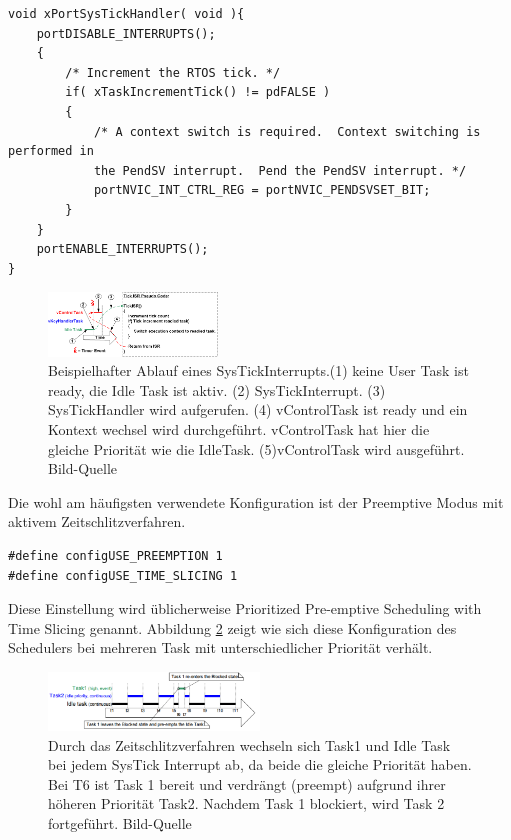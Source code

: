 \begin{lstlisting}[caption={FreeRTOS Source des SysTickHandlers aus Task.c. Der SysTickHandler verwaltet den TickCount. Der TickCount dient allen Timingfunktionen des RTOS Kernels als Zeitreferenz. Des Weiteren wird bei aktivem Time Slicing überprüft ob ein Kontextwechsel nötig ist. Der Kontext wechsel wir dann ggf. durch den PendSVHandler durchgeführt.}, linewidth=8cm,captionpos=b, label=lst:SysTickS, float=hbt]
void xPortSysTickHandler( void ){
	portDISABLE_INTERRUPTS();
	{
		/* Increment the RTOS tick. */
		if( xTaskIncrementTick() != pdFALSE )
		{
			/* A context switch is required.  Context switching is performed in
			the PendSV interrupt.  Pend the PendSV interrupt. */
			portNVIC_INT_CTRL_REG = portNVIC_PENDSVSET_BIT;
		}
	}
	portENABLE_INTERRUPTS();
}
\end{lstlisting}
\begin{figure}[htb]
	\centering
		\includegraphics[width=0.4\textwidth]{Pictures/FreeRTOSOrg/TickISR.png}
	\caption{Beispielhafter Ablauf eines SysTickInterrupts.(1) keine User Task ist ready, die Idle Task ist aktiv. (2) SysTickInterrupt. (3) SysTickHandler wird aufgerufen. (4) vControlTask ist ready und ein Kontext wechsel wird durchgeführt. vControlTask hat hier die gleiche Priorität wie die IdleTask. (5)vControlTask wird ausgeführt. Bild-Quelle~\protect{}}
	\label{fig:SysTick}
\end{figure}
\newline
Die wohl am häufigsten verwendete Konfiguration ist der Preemptive Modus mit aktivem Zeitschlitzverfahren.
\begin{lstlisting}[numbers = none]
#define configUSE_PREEMPTION 1
#define configUSE_TIME_SLICING 1
\end{lstlisting}
Diese Einstellung wird üblicherweise Prioritized Pre-emptive Scheduling with Time Slicing genannt. Abbildung \ref{fig:timeslice} zeigt wie sich diese Konfiguration des Schedulers bei mehreren Task mit unterschiedlicher Priorität verhält.
\begin{figure}[htb]
	\centering
		\includegraphics[width=0.5\textwidth]{Pictures/Scheduling/timeslice2.png}
	\caption{Durch das Zeitschlitzverfahren wechseln sich Task1 und Idle Task bei jedem SysTick Interrupt ab, da beide die gleiche Priorität haben. Bei T6 ist Task 1 bereit und verdrängt (preempt) aufgrund ihrer höheren Priorität Task2. Nachdem Task 1 blockiert, wird Task 2 fortgeführt. Bild-Quelle~\protect{}}
	\label{fig:timeslice}
\end{figure}







